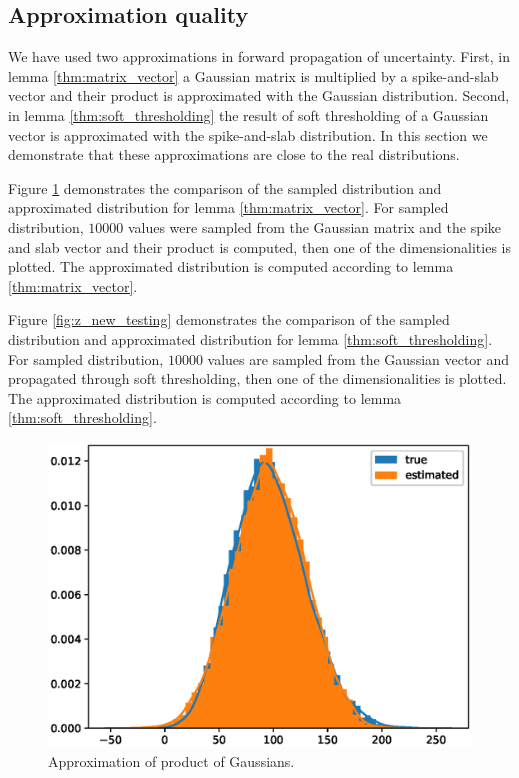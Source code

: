 \documentclass[letterpaper]{article}
\begin{document}
\subsection{Approximation quality}
\label{sec:approx_quality}
We have used two approximations in forward propagation of uncertainty. First, in lemma \ref{thm:matrix_vector} a Gaussian matrix is multiplied by a spike-and-slab vector and their product is approximated with the Gaussian distribution. Second, in lemma \ref{thm:soft_thresholding} the result of soft thresholding of a Gaussian vector is approximated with the spike-and-slab distribution. In this section we demonstrate that these approximations are close to the real distributions.

Figure \ref{fig:d_testing} demonstrates the comparison of the sampled distribution and approximated distribution for lemma \ref{thm:matrix_vector}. For sampled distribution, $10000$ values were sampled from the Gaussian matrix and the spike and slab vector and their product is computed, then one of the dimensionalities is plotted. The approximated distribution is computed according to lemma \ref{thm:matrix_vector}.

Figure \ref{fig:z_new_testing} demonstrates the comparison of the sampled distribution and approximated distribution for lemma \ref{thm:soft_thresholding}. For sampled distribution, $10000$ values are sampled from the Gaussian vector and propagated through soft thresholding, then one of the dimensionalities is plotted. The approximated distribution is computed according to lemma \ref{thm:soft_thresholding}.
\begin{figure}[t]
\includegraphics[width=\columnwidth]{d_testing}
\caption{Approximation of product of Gaussians.}
\label{fig:d_testing}
\end{figure}
\end{document}
